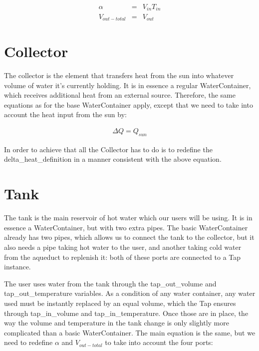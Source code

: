 \documentclass[a4paper,12pt]{article}
\begin{document}
\begin{eqnarray*}
\alpha &=& V_{in}T_{in}\\
V_{out-total} &=& V_{out}
\end{eqnarray*}

\pagebreak
\begin{adjustwidth}{-4em}{-4em}
\end{adjustwidth}
\pagebreak

\section{Collector}


The collector is the element that transfers heat from the sun into whatever volume of water it's currently holding. It is in essence a regular WaterContainer, which receives additional heat from an external source. Therefore, the same equations as for the base WaterContainer apply, except that we need to take into account the heat input from the sun by:

\begin{eqnarray*}
\Delta Q = Q_{sun}
\end{eqnarray*}

In order to achieve that all the Collector has to do is to redefine the delta\_heat\_definition in a manner consistent with the above equation.

\pagebreak
\begin{adjustwidth}{-4em}{-4em}
\end{adjustwidth}
\pagebreak

\section{Tank}

The tank is the main reservoir of hot water which our users will be using. It is in essence a WaterContainer, but with two extra pipes. The basic WaterContainer already has two pipes, which allows us to connect the tank to the collector, but it also needs a pipe taking hot water to the user, and another taking cold water from the aqueduct to replenish it: both of these ports are connected to a Tap instance.

The user uses water from the tank through the tap\_out\_volume and tap\_out\_temperature variables. As a condition of any water container, any water used must be instantly replaced by an equal volume, which the Tap ensures through tap\_in\_volume and tap\_in\_temperature. Once those are in place, the way the volume and temperature in the tank change is only slightly more complicated than a basic WaterContainer. The main equation is the same, but we need to redefine $\alpha$ and $V_{out-total}$ to take into account the four ports:
\end{document}
